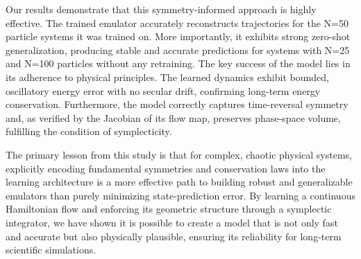 \documentclass[]{article}
\begin{document}
Our results demonstrate that this symmetry-informed approach is highly effective. The trained emulator accurately reconstructs trajectories for the N=50 particle systems it was trained on. More importantly, it exhibits strong zero-shot generalization, producing stable and accurate predictions for systems with N=25 and N=100 particles without any retraining. The key success of the model lies in its adherence to physical principles. The learned dynamics exhibit bounded, oscillatory energy error with no secular drift, confirming long-term energy conservation. Furthermore, the model correctly captures time-reversal symmetry and, as verified by the Jacobian of its flow map, preserves phase-space volume, fulfilling the condition of symplecticity.

The primary lesson from this study is that for complex, chaotic physical systems, explicitly encoding fundamental symmetries and conservation laws into the learning architecture is a more effective path to building robust and generalizable emulators than purely minimizing state-prediction error. By learning a continuous Hamiltonian flow and enforcing its geometric structure through a symplectic integrator, we have shown it is possible to create a model that is not only fast and accurate but also physically plausible, ensuring its reliability for long-term scientific simulations.


{}

\end{document}
